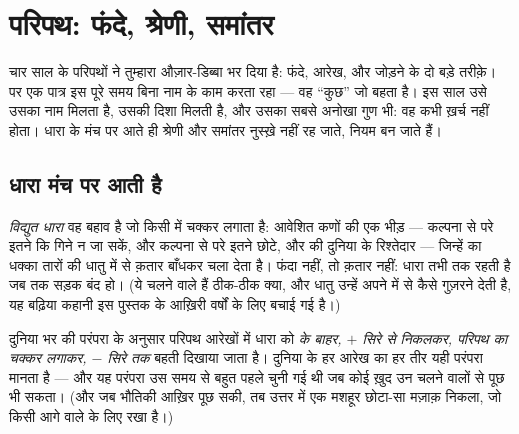 \chapter{परिपथ: फंदे, श्रेणी, समांतर}\label{ch:g7:circuits-series-parallel}

चार साल के परिपथों ने तुम्हारा औज़ार-डिब्बा भर दिया है: फंदे, आरेख,
और जोड़ने के दो बड़े तरीक़े। पर एक पात्र इस पूरे समय बिना नाम के काम
करता रहा --- वह ``कुछ'' जो बहता है। इस साल उसे उसका नाम मिलता है,
उसकी दिशा मिलती है, और उसका सबसे अनोखा गुण भी: वह कभी ख़र्च नहीं होता।
धारा के मंच पर आते ही श्रेणी और समांतर नुस्ख़े नहीं रह जाते, नियम बन
जाते हैं।

\section{धारा मंच पर आती है}

\begin{definition}[विद्युत धारा]\label{def:g7:circuits-series-parallel:current}
\emph{विद्युत धारा} वह बहाव है जो किसी 
में चक्कर लगाता है: आवेशित कणों की एक भीड़ --- कल्पना से परे इतने कि
गिने न जा सकें, और कल्पना से परे इतने छोटे, और  की दुनिया के
रिश्तेदार --- जिन्हें  का धक्का तारों की धातु में से क़तार बाँधकर
चला देता है। फंदा नहीं, तो क़तार नहीं: धारा तभी तक रहती है जब तक सड़क
बंद हो। (ये चलने वाले हैं ठीक-ठीक क्या, और धातु उन्हें अपने में से
कैसे गुज़रने देती है, यह बढ़िया कहानी इस पुस्तक के आख़िरी वर्षों के
लिए बचाई गई है।)
\end{definition}

\begin{proposition}[परंपरागत दिशा]\label{prop:g7:circuits-series-parallel:direction}
दुनिया भर की परंपरा के अनुसार परिपथ आरेखों में धारा को \emph{ के
बाहर, $+$ सिरे से निकलकर, परिपथ का चक्कर लगाकर, $-$ सिरे तक} बहती
दिखाया जाता है। दुनिया के हर आरेख का हर तीर यही परंपरा मानता है ---
और यह परंपरा उस समय से बहुत पहले चुनी गई थी जब कोई ख़ुद उन चलने वालों
से पूछ भी सकता। (और जब भौतिकी आख़िर पूछ सकी, तब उत्तर में एक मशहूर
छोटा-सा मज़ाक़ निकला, जो किसी आगे वाले  के लिए रखा है।)
\end{proposition}

